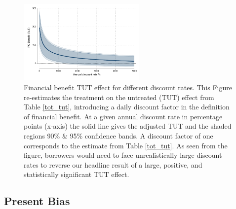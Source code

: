 \begin{appendix}
\vspace{-.3in}
\begin{figure}[!h]
  
    \begin{center}
        \centering
        \includegraphics[width=0.55\textwidth]{Figuras/discount_effect_tut.pdf}
    \end{center}
      \caption{Financial benefit TUT effect for different discount rates. This Figure re-estimates the treatment on the untreated (TUT) effect from Table \ref{tot_tut}, introducing a daily discount factor in the definition of financial benefit.  At a given annual discount rate in percentage points (x-axis) the solid line gives the adjusted TUT and the shaded regions 90\% \& 95\% confidence bands. A discount factor of one corresponds to the estimate from Table \ref{tot_tut}. As seen from the figure, borrowers would need to face unrealistically large discount rates to reverse our headline result of a large, positive, and statistically significant TUT effect.}
        \label{fc_discount_rates}
\end{figure}


\subsection{Present Bias}\label{App_presentbias}


\end{appendix}
